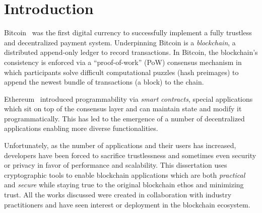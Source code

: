\chapter{Introduction}

Bitcoin~\cite{Nakamoto08} was the first digital currency to successfully implement a fully trustless and decentralized payment system. Underpinning Bitcoin is a \emph{blockchain}, a distributed append-only ledger to record transactions. In Bitcoin, the blockchain's consistency is enforced via a ``proof-of-work'' (PoW) consensus mechanism in which participants solve difficult computational puzzles (hash preimages) to append the newest bundle of transactions (a block) to the chain. 

Ethereum~\cite{ethereum} introduced programmability via \emph{smart contracts}, special applications which sit on top of the consensus layer and can maintain state and modify it programmatically. This has led to the emergence of a number of decentralized applications enabling more diverse functionalities. %


Unfortunately, as the number of applications and their users has increased, developers have been forced to sacrifice trustlessness and sometimes even security or privacy in favor of performance and scalability. This dissertation uses cryptographic tools to enable blockchain applications which are both \emph{practical} and \emph{secure} while staying true to the original blockchain ethos and minimizing trust. All the works discussed were created in collaboration with industry practitioners and have seen interest or deployment in the blockchain ecosystem.


